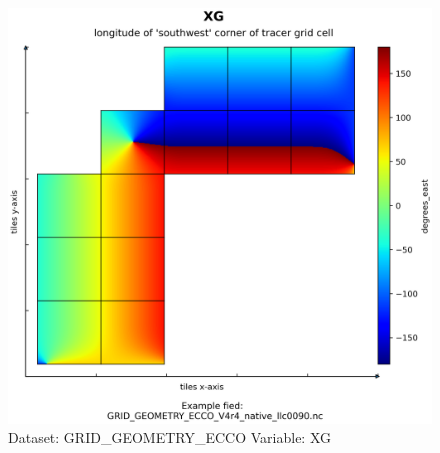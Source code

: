 \begin{figure}[H]
\centering
\includegraphics[width=\textwidth]{../images/plots/native_plots_coords/Geometry_Parameters_for_the_Lat-Lon-Cap_90_(llc90)_Native_Model_Grid_(Version_4_Release_4)/XG.png}
\caption{Dataset: GRID\_GEOMETRY\_ECCO Variable: XG}
\label{tab:table-GRID_GEOMETRY_ECCO_XG-Plot}
\end{figure}
\pagebreak
